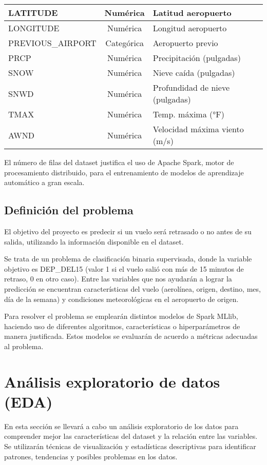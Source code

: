 \documentclass[runningheads]{llncs}
\begin{document}
\begin{table}[h!]
\begin{tabular}{|l|c|l|}
LATITUDE & Numérica & Latitud aeropuerto \\ \hline
LONGITUDE & Numérica & Longitud aeropuerto \\ \hline
PREVIOUS\_AIRPORT & Categórica & Aeropuerto previo \\ \hline
PRCP & Numérica & Precipitación (pulgadas) \\ \hline
SNOW & Numérica & Nieve caída (pulgadas) \\ \hline
SNWD & Numérica & Profundidad de nieve (pulgadas) \\ \hline
TMAX & Numérica & Temp. máxima (°F) \\ \hline
AWND & Numérica & Velocidad máxima viento (m/s) \\ \hline
\end{tabular}
\end{table}

El número de filas del dataset justifica el uso de Apache Spark, motor de procesamiento 
distribuido, para el entrenamiento de modelos de aprendizaje automático a gran escala.

\subsection{Definición del problema}
El objetivo del proyecto es predecir si un vuelo será retrasado o no antes de su salida, 
utilizando la información disponible en el dataset.

Se trata de un problema de clasificación binaria supervisada, donde la variable objetivo es 
DEP\_DEL15 (valor 1 si el vuelo salió con más de 15 minutos de retraso, 0 en otro caso). 
Entre las variables que nos ayudarán a lograr la predicción se encuentran características 
del vuelo (aerolínea, origen, destino, mes, día de la semana) y condiciones meteorológicas 
en el aeropuerto de origen.

Para resolver el problema se emplearán distintos modelos de Spark MLlib, haciendo uso de 
diferentes algoritmos, características o hiperparámetros de manera justificada. Estos modelos se evaluarán de 
acuerdo a métricas adecuadas al problema.


\section{Análisis exploratorio de datos (EDA)}

En esta sección se llevará a cabo un análisis exploratorio de los datos para comprender mejor las características
 del dataset y la relación entre las variables. Se utilizarán técnicas de visualización y estadísticas descriptivas 
 para identificar patrones, tendencias y posibles problemas en los datos.
\end{document}

